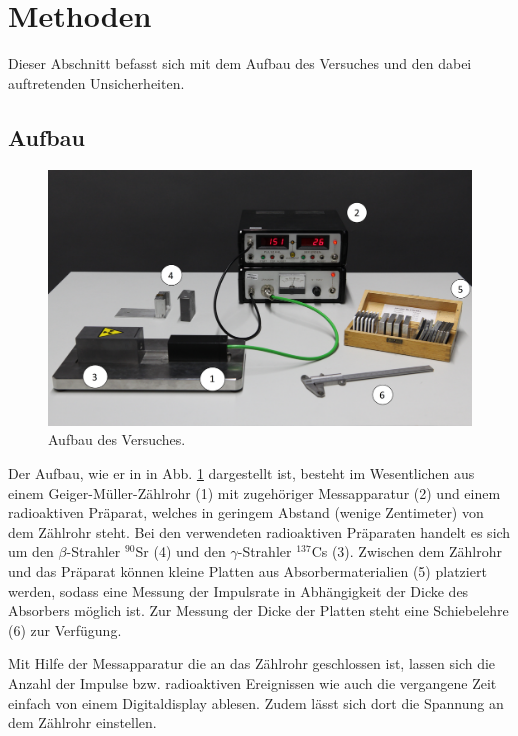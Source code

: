\section{Methoden}
	
	Dieser Abschnitt befasst sich mit dem Aufbau des Versuches und den dabei auftretenden Unsicherheiten.
	
	\subsection{Aufbau}	
		
		\begin{figure}[ht]
			\centering
			\includegraphics[width=\textwidth]{Aufbau.png}
			\caption{Aufbau des Versuches.\cite{WWU}}
			\label{fig:Aufbau}	
		\end{figure}
		Der Aufbau, wie er in in Abb. \ref{fig:Aufbau} dargestellt ist, besteht im Wesentlichen aus einem Geiger-Müller-Zählrohr (1) mit zugehöriger Messapparatur (2) und einem radioaktiven Präparat, welches in geringem Abstand (wenige Zentimeter) von dem Zählrohr steht.
		Bei den verwendeten radioaktiven Präparaten handelt es sich um den $\beta$-Strahler $^{90}$Sr (4) und den $\gamma$-Strahler $^{137}$Cs (3).
		Zwischen dem Zählrohr und das Präparat können kleine Platten aus Absorbermaterialien (5) platziert werden, sodass eine Messung der Impulsrate in Abhängigkeit der Dicke des Absorbers möglich ist.
		Zur Messung der Dicke der Platten steht eine Schiebelehre (6) zur Verfügung.
		
		Mit Hilfe der Messapparatur die an das Zählrohr geschlossen ist, lassen sich die Anzahl der Impulse bzw. radioaktiven Ereignissen wie auch die vergangene Zeit einfach von einem Digitaldisplay ablesen.
		Zudem lässt sich dort die Spannung an dem Zählrohr einstellen.
		

